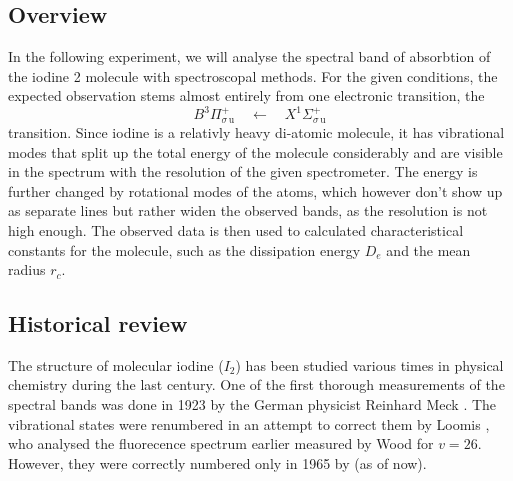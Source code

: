 \subsection{Overview}
In the following experiment, we will analyse the spectral band of absorbtion of the iodine 2 molecule 
with spectroscopal methods. For the given conditions, the expected observation stems almost 
entirely from one electronic transition, the 
\begin{equation}
    B ^3\Pi_{\sigma \, \mathrm{u}}^{+} \quad \leftarrow \quad X ^1\Sigma_{\sigma \, \mathrm{u}}^{+}
\end{equation}
transition. Since iodine is a relativly heavy di-atomic molecule, it has vibrational modes that 
split up the total energy of the molecule considerably and are visible in the spectrum with the 
resolution of the given spectrometer. The energy is further changed by rotational modes of the 
atoms, which however don't show up as separate lines but rather widen the observed bands, as the 
resolution is not high enough. 
The observed data is then used to calculated characteristical constants for the molecule, such as 
the dissipation energy $D_e$ and the mean radius $r_c$. 

\subsection{Historical review}
The structure of molecular iodine ($I_2$) has been studied various times in physical chemistry 
during the last century. One of the first thorough measurements of the spectral bands was done in 
1923 by the German physicist Reinhard Meck \cite{mecke1923bandenspektrum}. The vibrational states 
were renumbered in an attempt to correct them by Loomis \cite{loomis1927correlation}, who analysed 
the fluorecence spectrum earlier measured by Wood \cite{wood1911} for $v = 26$. However, they were 
correctly numbered only in 1965 by \cite{steinfeld1965spectroscopic} (as of now). 


